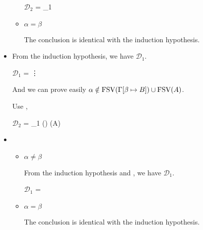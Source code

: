 \begin{itemize}
\begin{itemize}
	      	      $\mathcal{D}_2$ = 
	      	      {_1}
	      	      	      	      	      	      	      	      
	      	\item $\alpha = \beta$
	      	      	      	      	      	      	      	      
	      	      The conclusion is identical with the induction hypothesis.
	      	      	      	      	      	      	      	      
	      \end{itemize}
	      	      	      	      
	      	      	      	      
	\item \KGen
	      	      	      	      
	      From the induction hypothesis, we have $\mathcal{D}_1$.
	      	      	      	      
	      $\mathcal{D}_1$ = 
	      {\vdots}
	      	      	      	      
	      And we can prove easily $\alpha \notin \text{FSV}(\Gamma[\beta \mapsto B]) \cup \text{FSV}(A)$.
	      	      	      	      
	      Use \KGen,
	      	      	      	      
	      $\mathcal{D}_2$ = 
	      {_1 \andalso \alpha \notin \FTV(\GG) \cup \FTV(A)}
	      	      	      	      
	\item \KCsp
	      	      	      	      
	      \begin{itemize}
	      		      		      		      	
	      	\item $\alpha \neq \beta$
	      	      	      	      	      	      
	      	      From the induction hypothesis and \KCsp, we have $\mathcal{D}_1$.
	      	      	      	      	      	      
	      	      $\mathcal{D}_1$ = 
	      	      {}
	      	      	      	      	      	      
	      	\item $\alpha = \beta$
	      	      	      	      	      	      
	      	      The conclusion is identical with the induction hypothesis.
	      	      	      	      	      	      

\end{itemize}
\end{itemize}
